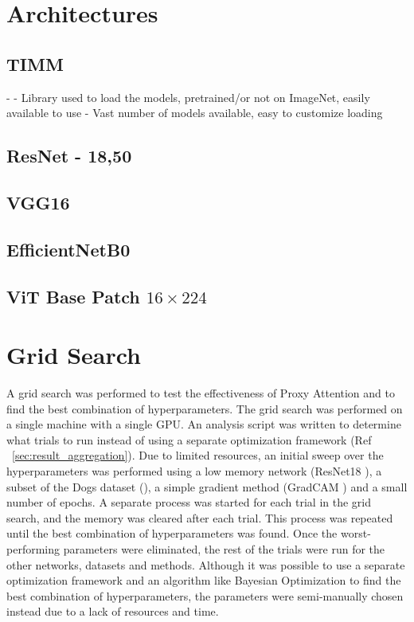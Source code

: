 \section{Architectures}
\subsection{TIMM}
- \cite{rw2019timm}
- Library used to load the models, pretrained/or not on ImageNet, easily available to use
- Vast number of models available, easy to customize loading
\subsection{ResNet - 18,50}
\subsection{VGG16}
\subsection{EfficientNetB0}
\subsection{ViT Base Patch $16\times224$}

\section{Grid Search}
A grid search was performed to test the effectiveness of Proxy Attention and to find the best combination of hyperparameters. The grid search was performed on a single machine with a single GPU. An analysis script was written to determine what trials to run instead of using a separate optimization framework (Ref ~\ref{sec:result_aggregation}). 
Due to limited resources, an initial sweep over the hyperparameters was performed using a low memory network (ResNet18 \cite{heDeepResidualLearning2016}), a subset of the Dogs dataset (\cite{khoslaNovelDatasetFineGrained}), a simple gradient method (GradCAM \cite{selvarajuGradCAMVisualExplanations}) and a small number of epochs. A separate process was started for each trial in the grid search, and the memory was cleared after each trial. This process was repeated until the best combination of hyperparameters was found. Once the worst-performing parameters were eliminated, the rest of the trials were run for the other networks, datasets and methods.
Although it was possible to use a separate optimization framework and an algorithm like Bayesian Optimization to find the best combination of hyperparameters, the parameters were semi-manually chosen instead due to a lack of resources and time.


